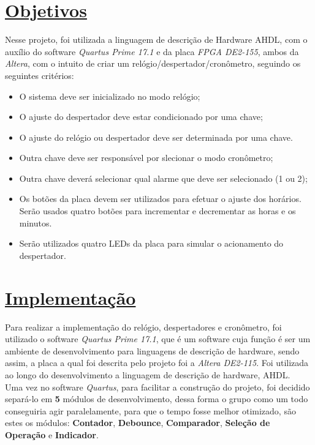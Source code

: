 \documentclass[14pt, oneside]{book}
\newcommand\tab[1][1cm]{\hspace*{#1}}
\theoremstyle{definition}
\begin{document}
        \chapter[Objetivos]{\hypertarget{obj}{}\hyperlink{toc}{Objetivos}}
             \tab Nesse projeto, foi utilizada a linguagem de descrição de Hardware AHDL, com o auxílio do software \textit{Quartus Prime 17.1} e da placa \textit{FPGA DE2-155}, ambos da \textit{Altera}, com o intuito de criar um relógio/despertador/cronômetro, seguindo os seguintes critérios:
            \begin{itemize}
                \item O sistema deve ser inicializado no modo relógio;
                \item O ajuste do despertador deve estar condicionado por uma chave;
                \item O ajuste do relógio ou despertador deve ser determinada por uma chave.
                \item Outra chave deve ser responsável por slecionar o modo cronômetro;
                \item Outra chave deverá selecionar qual alarme que deve ser selecionado (1 ou 2);
                \item Os botões da placa devem ser utilizados para efetuar o ajuste dos horários. Serão usados quatro botões para incrementar e decrementar as horas e os minutos.
                \item Serão utilizados quatro LEDs da placa para simular o acionamento do despertador.
            \end{itemize}
            
            
        \chapter[Implementação]{\hyperlink{toc}{Implementação}}
            \tab Para realizar a implementação do relógio, despertadores e cronômetro, foi utilizado o software \textit{Quartus Prime 17.1}, que é um software cuja função é ser um ambiente de desenvolvimento para linguagens de descrição de hardware, sendo assim, a placa a qual foi descrita pelo projeto foi a \textit{Altera DE2-115}. Foi utilizada ao longo do desenvolvimento a linguagem de descrição de hardware, AHDL. \\
            \tab Uma vez no software \textit{Quartus}, para facilitar a construção do projeto, foi decidido separá-lo em \textbf{5} módulos de desenvolvimento, dessa forma o grupo como um todo conseguiria agir paralelamente, para que o tempo fosse melhor otimizado, são estes os módulos: \textbf {Contador}, \textbf{Debounce}, \textbf{Comparador}, \textbf{Seleção de Operação} e \textbf{Indicador}.
            
\end{document}

